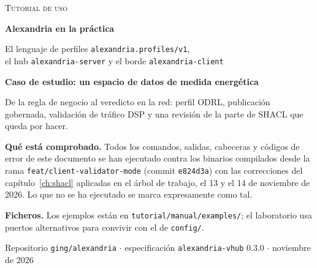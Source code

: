 \documentclass[11pt,a4paper,openany,oneside]{book}
\newcommand{\cod}[1]{\nolinkurl{#1}}
\begin{document}
\begin{titlepage}
\vspace*{0.6cm}
\begin{flushleft}
{\color{white}\large\scshape Tutorial de uso\par}
\vspace{0.7cm}
{\color{white}\fontsize{34}{40}\selectfont\bfseries Alexandria en la práctica\par}
\vspace{0.5cm}
{\color{white!85}\Large El lenguaje de perfiles \texttt{alexandria.profiles/v1},\\[2pt]
el hub \texttt{alexandria-server} y el borde \texttt{alexandria-client}\par}
\end{flushleft}
\vspace{3.4cm}
\begin{flushleft}
{\Large\color{alxNavy}\bfseries Caso de estudio: un espacio de datos de medida energética\par}
\vspace{0.4cm}
{\large\color{alxNavy!80} De la regla de negocio al veredicto en la red: perfil ODRL, publicación gobernada,
validación de tráfico DSP y una revisión de la parte de SHACL que queda por hacer.\par}
\end{flushleft}
\vfill
\begin{tcolorbox}[enhanced, colback=alxSlate, colframe=alxBorder, boxrule=0.6pt, arc=3pt, left=10pt, right=10pt, top=8pt, bottom=8pt]
\small
\textbf{Qué está comprobado.} Todos los comandos, salidas, cabeceras y códigos de error de este documento se han
ejecutado contra los binarios compilados desde la rama \cod{feat/client-validator-mode} (commit \cod{e824d3a})
con las correcciones del capítulo~\ref{ch:shacl} aplicadas en el árbol de trabajo, el 13 y el 14 de noviembre de
2026. Lo que no se ha ejecutado se marca expresamente como tal.

\medskip
\textbf{Ficheros.} Los ejemplos están en \cod{tutorial/manual/examples/}; el laboratorio usa puertos alternativos
para convivir con el de \cod{config/}.
\end{tcolorbox}
\vspace{0.4cm}
{\small\color{gray} Repositorio \cod{ging/alexandria} $\cdot$ especificación \cod{alexandria-vhub} 0.3.0 $\cdot$ noviembre de 2026}
\end{titlepage}
\end{document}

